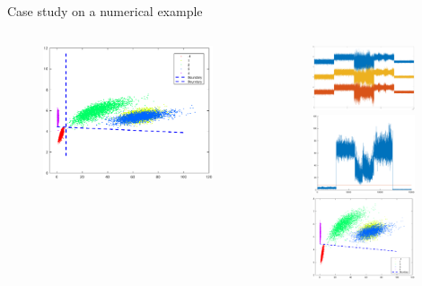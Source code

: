\documentclass[10pt]{beamer}
\begin{document}
\begin{frame}{Case study on a numerical example}
     \begin{columns}
             \begin{column}{0.5\textwidth}
              \begin{figure}
              \centering
           \includegraphics[width=5cm]{fig/perfectR.eps}
            \end{figure}
           \end{column}
        \begin{column}{0.5\textwidth}  %
   \begin{figure}
        \centering
        \includegraphics[width=3cm]{fig/Coriginal.eps} \\
        \includegraphics[width=3cm]{fig/thresholdT.eps} \\
        \includegraphics[width=3cm]{fig/miniVarP.eps}
        \end{figure}
  
        \end{column}
    \end{columns}
\end{frame}
\end{document}
